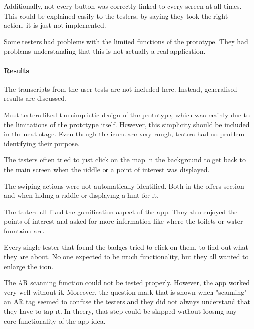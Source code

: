 \documentclass[10pt,twocolumn]{article} %
\begin{document}
Additionally, not every button was correctly linked to every screen at all times. This could be explained easily to the testers, by saying they took the right action, it is just not implemented.

Some testers had problems with the limited functions of the prototype. They had problems understanding that this is not actually a real application.

\paragraph{Results}
The transcripts from the user tests are not included here. Instead, generalised results are discussed. 

Most testers liked the simplistic design of the prototype, which was mainly due to the limitations of the prototype itself. However, this simplicity should be included in the next stage. Even though the icons are very rough, testers had no problem identifying their purpose. 

The testers often tried to just click on the map in the background to get back to the main screen when the riddle or a point of interest was displayed. 

The swiping actions were not automatically identified. Both in the offers section and when hiding a riddle or displaying a hint for it.

The testers all liked the gamification aspect of the app. They also enjoyed the points of interest and asked for more information like where the toilets or water fountains are. 

Every single tester that found the badges tried to click on them, to find out what they are about. No one expected to be much functionality, but they all wanted to enlarge the icon. 

The AR scanning function could not be tested properly. However, the app worked very well without it. Moreover, the question mark that is shown when "scanning" an AR tag seemed to confuse the testers and they did not always understand that they have to tap it. In theory, that step could be skipped without loosing any core functionality of the app idea.
\end{document}
